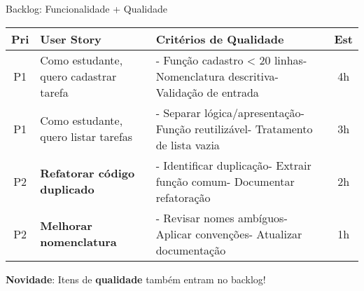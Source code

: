 \documentclass[10pt]{beamer}
\begin{document}
\begin{frame}{Backlog: Funcionalidade + Qualidade}
\scriptsize
\begin{tabular}{|c|p{4cm}|p{4cm}|c|}
\hline
\textbf{Pri} & \textbf{User Story} & \textbf{Critérios de Qualidade} & \textbf{Est} \\
\hline
P1 & Como estudante, quero cadastrar tarefa & - Função cadastro < 20 linhas\newline - Nomenclatura descritiva\newline - Validação de entrada & 4h \\
\hline
P1 & Como estudante, quero listar tarefas & - Separar lógica/apresentação\newline - Função reutilizável\newline - Tratamento de lista vazia & 3h \\
\hline
P2 & \textbf{Refatorar código duplicado} & - Identificar duplicação\newline - Extrair função comum\newline - Documentar refatoração & 2h \\
\hline
P2 & \textbf{Melhorar nomenclatura} & - Revisar nomes ambíguos\newline - Aplicar convenções\newline - Atualizar documentação & 1h \\
\hline
\end{tabular}

\vspace{0.3cm}
\textbf{Novidade}: Itens de \textbf{qualidade} também entram no backlog!
\end{frame}
\end{document}
